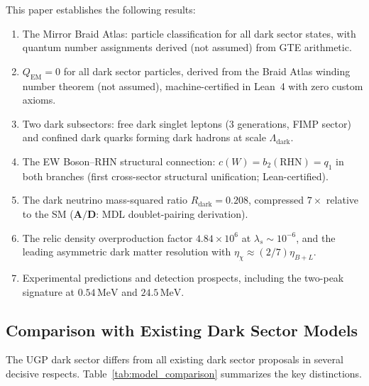 \documentclass[11pt]{article}
\newcommand{\CatAD}{\textbf{A/D}}
\begin{document}
This paper establishes the following results:
\begin{enumerate}[nosep]
\item The Mirror Braid Atlas: particle classification for all dark sector states, with
      quantum number assignments derived (not assumed) from GTE arithmetic.
\item $Q_\mathrm{EM} = 0$ for all dark sector particles, derived from the Braid Atlas
      winding number theorem (not assumed), machine-certified in Lean~4 with zero
      custom axioms.
\item Two dark subsectors: free dark singlet leptons (3 generations, FIMP sector) and
      confined dark quarks forming dark hadrons at scale $\Lambda_\mathrm{dark}$.
\item The EW Boson--RHN structural connection: $c(W) = b_2(\mathrm{RHN}) = q_1$ in both
      branches (first cross-sector structural unification; Lean-certified).
\item The dark neutrino mass-squared ratio $R_\mathrm{dark} = 0.208$, compressed
      $7\times$ relative to the SM ($\CatAD$: MDL doublet-pairing derivation).
\item The relic density overproduction factor $4.84\times10^6$ at $\lambda_s\sim10^{-6}$,
      and the leading asymmetric dark matter resolution with $\eta_\chi\approx(2/7)\eta_{B+L}$.
\item Experimental predictions and detection prospects, including the two-peak signature
      at $0.54\,\mathrm{MeV}$ and $24.5\,\mathrm{MeV}$.
\end{enumerate}

\subsection{Comparison with Existing Dark Sector Models}
\label{ssec:comparison}

The UGP dark sector differs from all existing dark sector proposals in several decisive
respects. Table~\ref{tab:model_comparison} summarizes the key distinctions.
\end{document}
